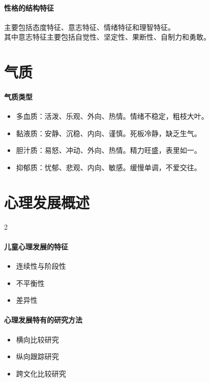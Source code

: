 \documentclass[b5paper,11pt]{article}
\begin{document}
\paragraph{性格的结构特征} 主要包括态度特征、意志特征、情绪特征和理智特征。 \\
其中意志特征主要包括自觉性、坚定性、果断性、自制力和勇敢。

\section{气质}
\paragraph{气质类型}
\begin{itemize}
  \item 多血质：活泼、乐观、外向、热情。情绪不稳定，粗枝大叶。
  \item 黏液质：安静、沉稳、内向、谨慎。死板冷静，缺乏生气。
  \item 胆汁质：易怒、冲动、外向、热情。精力旺盛，表里如一。
  \item 抑郁质：忧郁、悲观、内向、敏感。缓慢单调，不爱交往。
\end{itemize}

\section{心理发展概述}
\begingroup
{}
\setlength{\columnsep}{1em}
\begin{paracol}{2}

  \paragraph{儿童心理发展的特征}
  \begin{itemize}
    \item 连续性与阶段性
    \item 不平衡性
    \item 差异性
  \end{itemize}

  \switchcolumn

  \paragraph{心理发展特有的研究方法}
  \begin{itemize}
    \item 横向比较研究
    \item 纵向跟踪研究
    \item 跨文化比较研究
  \end{itemize}

\end{paracol}
\endgroup
\end{document}
